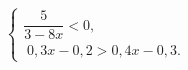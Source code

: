 \begin{ex}[type=ineq_system]
	\begin{condition}
		$\begin{cases} \dfrac{5}{3 - 8x}<0   ,\\
			\;  0,3x - 0,2>0,4x - 0,3 .
		\end{cases}$
	\end{condition}
\end{ex}